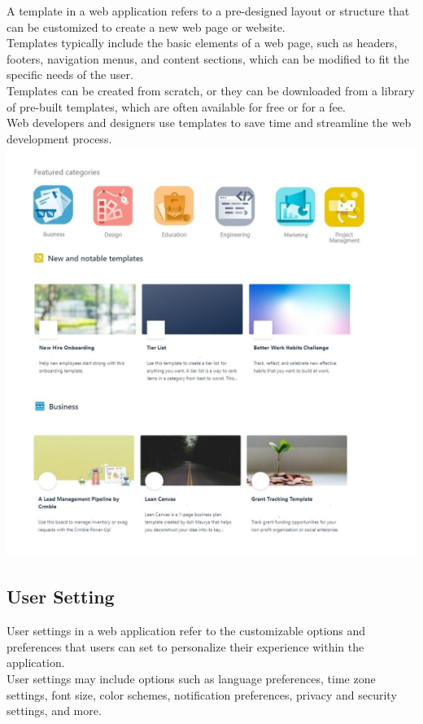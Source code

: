 A template in a web application refers to a pre-designed layout or structure that can be customized to create a new web page or website.\\

Templates typically include the basic elements of a web page, such as headers, footers, navigation menus, and content sections, which can be modified to fit the specific needs of the user.\\

Templates can be created from scratch, or they can be downloaded from a library of pre-built templates, which are often available for free or for a fee.\\

Web developers and designers use templates to save time and streamline the web development process.
\includegraphics[width=0.8\columnwidth]{WA-workflix-HW1/images/template.jpg}


\subsection{User Setting}

User settings in a web application refer to the customizable options and preferences that users can set to personalize their experience within the application.\\

User settings may include options such as language preferences, time zone settings, font size, color schemes, notification preferences, privacy and security settings, and more.\\

